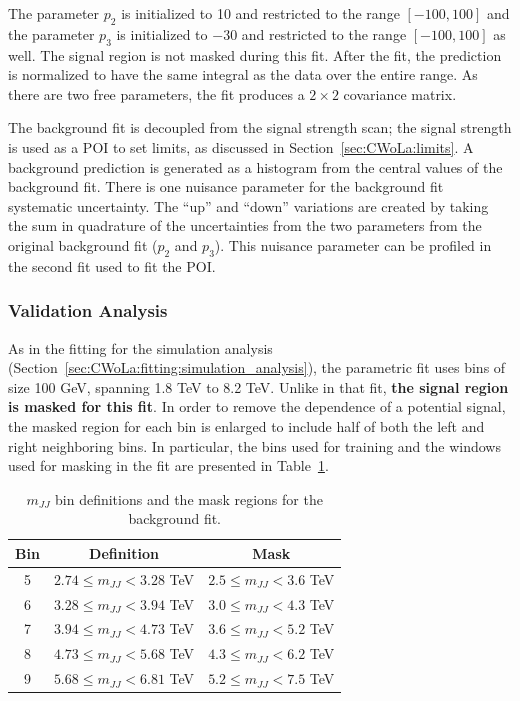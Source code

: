 The parameter $p_2$ is initialized to 10 and restricted to the range $[-100,100]$ and the parameter $p_3$ is initialized to $-30$ and restricted to the range $[-100,100]$ as well.
The signal region is not masked during this fit.
After the fit, the prediction is normalized to have the same integral as the data over the entire range.
As there are two free parameters, the fit produces a $2\times 2$ covariance matrix.  

The background fit is decoupled from the signal strength scan; the signal strength is used as a POI to set limits, as discussed in Section~\ref{sec:CWoLa:limits}.
A background prediction is generated as a histogram from the central values of the background fit.
There is one nuisance parameter for the background fit systematic uncertainty.
The ``up'' and ``down'' variations are created by taking the sum in quadrature of the uncertainties from the two parameters from the original background fit ($p_2$ and $p_3$).
This nuisance parameter can be profiled in the second fit used to fit the POI.   

\subsubsection{Validation Analysis}
\label{sec:CWoLa:fitting:val_analysis}
As in the fitting for the simulation analysis (Section~\ref{sec:CWoLa:fitting:simulation_analysis}), the parametric fit uses bins of size 100 GeV, spanning 1.8 TeV to 8.2 TeV.
Unlike in that fit, \textbf{the signal region is masked for this fit}.
In order to remove the dependence of a potential signal, the masked region for each bin is enlarged to include half of both the left and right neighboring bins.
In particular, the bins used for training and the windows used for masking in the fit are presented in Table~\ref{tab:mjj_bins2}.

\begin{table}[htb]
  \centering
  \caption{\label{tab:mjj_bins2} $m_{JJ}$ bin definitions and the mask regions for the background fit.}
  \begin{tabular}{c c c}
    \hline
    Bin & Definition & Mask  \\ \hline
    5 & $2.74 \le m_{JJ} < 3.28$ TeV & $2.5 \le m_{JJ} < 3.6$ TeV \\
    6 & $3.28 \le m_{JJ} < 3.94$ TeV & $3.0 \le m_{JJ} < 4.3$ TeV \\
    7 & $3.94 \le m_{JJ} < 4.73$ TeV & $3.6 \le m_{JJ} < 5.2$ TeV \\
    8 & $4.73 \le m_{JJ} < 5.68$ TeV & $4.3 \le m_{JJ} < 6.2$ TeV \\
    9 & $5.68 \le m_{JJ} < 6.81$ TeV & $5.2 \le m_{JJ} < 7.5$ TeV \\
    \hline
  \end{tabular}
\end{table} 

